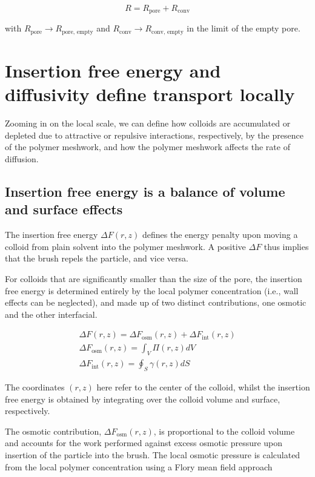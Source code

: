 \documentclass[12pt, a4paper]{article}
\begin{document}
\begin{equation}
    R=R_{\text{pore}}+R_{\text{conv}}
    \label{eq:R_tot_tot}
\end{equation}
    
\noindent with $R_{\text{pore}}\rightarrow R_{\text{pore, empty}}$ and $R_{\text{conv}}\rightarrow R_{\text{conv, empty}}$ in the limit of the empty pore. 


\section{Insertion free energy and diffusivity define transport locally}

Zooming in on the local scale, we can define how colloids are accumulated or depleted due to attractive or repulsive interactions, respectively, by the presence of the polymer meshwork, 
and how the polymer meshwork affects the rate of diffusion.

\subsection{Insertion free energy is a balance of volume and surface effects}

The insertion free energy $\Delta F(r,z)$ defines the energy penalty upon moving a colloid from plain solvent into the polymer meshwork.
A positive $\Delta F$ thus implies that the brush repels the particle, and vice versa.

For colloids that are significantly smaller than the size of the pore, the insertion free energy is determined entirely by the local polymer concentration (i.e., wall effects can be neglected), 
and made up of two distinct contributions, one osmotic and the other interfacial.

\begin{eqnarray}
    \Delta F (r,z)= \Delta F_{\text{osm}}(r,z) + \Delta F_{\text{int}}(r,z)
    \\
    \Delta F_{\text{osm}}(r,z) = \int_{V} \Pi(r,z) dV
    \\
    \Delta F_{\text{int}}(r,z) = \oint_{S} \gamma (r,z) dS
    \label{eq:Delta_F}
\end{eqnarray}

\noindent The coordinates $(r,z)$ here refer to the center of the colloid, whilst the insertion free energy is obtained by integrating over the colloid volume and surface, respectively.

The osmotic contribution, $\Delta F_{\text{osm}}(r,z)$, is proportional to the colloid volume 
and accounts for the work performed against excess osmotic pressure upon insertion of the particle into the brush. 
The local osmotic pressure is calculated from the local polymer concentration using a Flory mean field approach 
\end{document}
